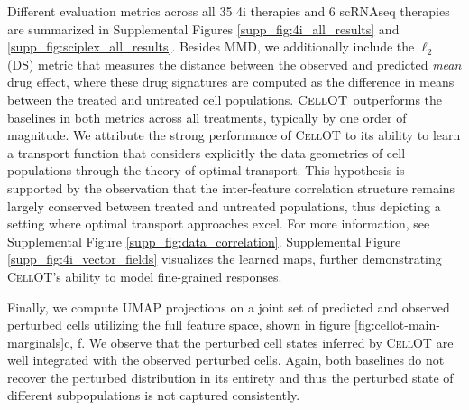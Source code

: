 Different evaluation metrics across all 35 4i therapies and 6 scRNAseq therapies are summarized in Supplemental Figures \ref{supp_fig:4i_all_results} and \ref{supp_fig:sciplex_all_results}.
Besides MMD, we additionally include the $\ell_2$(DS) metric that measures the distance between the observed and predicted \emph{mean} drug effect, where these drug signatures are computed as the difference in means between the treated and untreated cell populations.
$\textsc{CellOT}$ outperforms the baselines in both metrics across all treatments, typically by one order of magnitude.
We attribute the strong performance of \textsc{CellOT} to its ability to learn a transport function that considers explicitly the data geometries of cell populations through the theory of optimal transport.
This hypothesis is supported by the observation that the inter-feature correlation structure remains largely conserved between treated and untreated populations, thus depicting a setting where optimal transport approaches excel. For more information, see Supplemental Figure \ref{supp_fig:data_correlation}.
Supplemental Figure \ref{supp_fig:4i_vector_fields} visualizes the learned maps, %
further demonstrating \textsc{CellOT}'s ability to model fine-grained responses. %

Finally, we compute UMAP projections \cite{mcinnes2018} on a joint set of predicted and observed perturbed cells utilizing the full feature space, shown in figure \ref{fig:cellot-main-marginals}c, f.
We observe that the perturbed cell states inferred by \textsc{CellOT} are well integrated with the observed perturbed cells. Again, both baselines do not recover the perturbed distribution in its entirety %
and thus the perturbed state of different subpopulations is not captured consistently.

